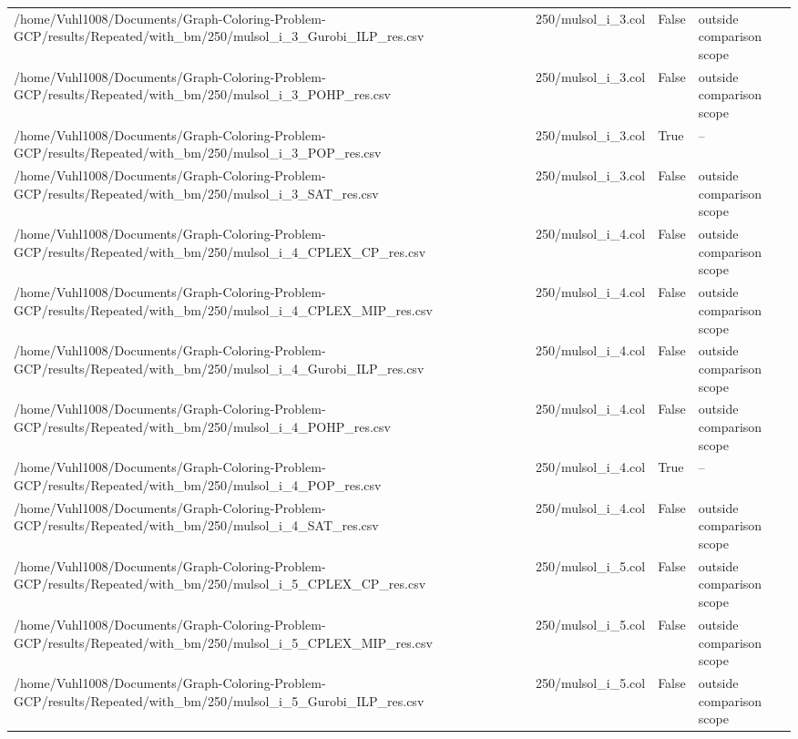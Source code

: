 \begin{table}[htbp]
\begin{tabular}{llll}
/home/Vuhl1008/Documents/Graph-Coloring-Problem-GCP/results/Repeated/with\_bm/250/mulsol\_i\_3\_Gurobi\_ILP\_res.csv & 250/mulsol\_i\_3.col & False & outside comparison scope \\
/home/Vuhl1008/Documents/Graph-Coloring-Problem-GCP/results/Repeated/with\_bm/250/mulsol\_i\_3\_POHP\_res.csv & 250/mulsol\_i\_3.col & False & outside comparison scope \\
/home/Vuhl1008/Documents/Graph-Coloring-Problem-GCP/results/Repeated/with\_bm/250/mulsol\_i\_3\_POP\_res.csv & 250/mulsol\_i\_3.col & True & -- \\
/home/Vuhl1008/Documents/Graph-Coloring-Problem-GCP/results/Repeated/with\_bm/250/mulsol\_i\_3\_SAT\_res.csv & 250/mulsol\_i\_3.col & False & outside comparison scope \\
/home/Vuhl1008/Documents/Graph-Coloring-Problem-GCP/results/Repeated/with\_bm/250/mulsol\_i\_4\_CPLEX\_CP\_res.csv & 250/mulsol\_i\_4.col & False & outside comparison scope \\
/home/Vuhl1008/Documents/Graph-Coloring-Problem-GCP/results/Repeated/with\_bm/250/mulsol\_i\_4\_CPLEX\_MIP\_res.csv & 250/mulsol\_i\_4.col & False & outside comparison scope \\
/home/Vuhl1008/Documents/Graph-Coloring-Problem-GCP/results/Repeated/with\_bm/250/mulsol\_i\_4\_Gurobi\_ILP\_res.csv & 250/mulsol\_i\_4.col & False & outside comparison scope \\
/home/Vuhl1008/Documents/Graph-Coloring-Problem-GCP/results/Repeated/with\_bm/250/mulsol\_i\_4\_POHP\_res.csv & 250/mulsol\_i\_4.col & False & outside comparison scope \\
/home/Vuhl1008/Documents/Graph-Coloring-Problem-GCP/results/Repeated/with\_bm/250/mulsol\_i\_4\_POP\_res.csv & 250/mulsol\_i\_4.col & True & -- \\
/home/Vuhl1008/Documents/Graph-Coloring-Problem-GCP/results/Repeated/with\_bm/250/mulsol\_i\_4\_SAT\_res.csv & 250/mulsol\_i\_4.col & False & outside comparison scope \\
/home/Vuhl1008/Documents/Graph-Coloring-Problem-GCP/results/Repeated/with\_bm/250/mulsol\_i\_5\_CPLEX\_CP\_res.csv & 250/mulsol\_i\_5.col & False & outside comparison scope \\
/home/Vuhl1008/Documents/Graph-Coloring-Problem-GCP/results/Repeated/with\_bm/250/mulsol\_i\_5\_CPLEX\_MIP\_res.csv & 250/mulsol\_i\_5.col & False & outside comparison scope \\
/home/Vuhl1008/Documents/Graph-Coloring-Problem-GCP/results/Repeated/with\_bm/250/mulsol\_i\_5\_Gurobi\_ILP\_res.csv & 250/mulsol\_i\_5.col & False & outside comparison scope \\

\end{tabular}
\end{table}
